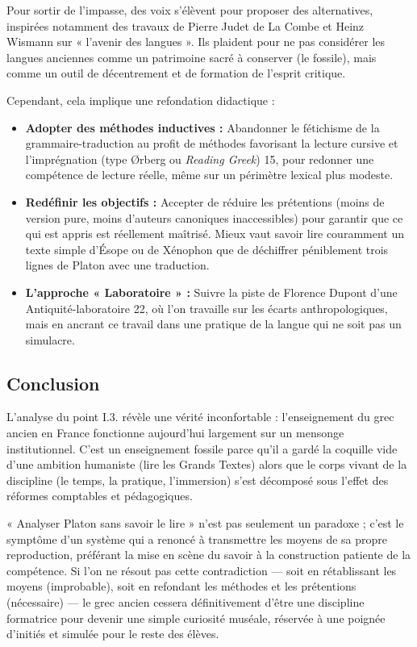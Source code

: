 Pour sortir de l'impasse, des voix s'élèvent pour proposer des alternatives, inspirées notamment des
travaux de Pierre Judet de La Combe et Heinz Wismann sur « l'avenir des langues ».\cite{I-3-3-ref23}
Ils plaident pour ne pas considérer les langues anciennes comme un patrimoine sacré à conserver (le
fossile), mais comme un outil de décentrement et de formation de l'esprit critique.

Cependant, cela implique une refondation didactique :

\begin{itemize}\item \textbf{Adopter des méthodes inductives :} Abandonner le fétichisme de la grammaire-traduction au profit de méthodes favorisant la lecture cursive et l'imprégnation (type Ørberg ou \textit{Reading Greek}) 15, pour redonner une compétence de lecture réelle, même sur un périmètre lexical plus modeste.\item \textbf{Redéfinir les objectifs :} Accepter de réduire les prétentions (moins de version pure, moins d'auteurs canoniques inaccessibles) pour garantir que ce qui est appris est réellement maîtrisé. Mieux vaut savoir lire couramment un texte simple d'Ésope ou de Xénophon que de déchiffrer péniblement trois lignes de Platon avec une traduction.\item \textbf{L'approche « Laboratoire » :} Suivre la piste de Florence Dupont d'une Antiquité-laboratoire 22, où l'on travaille sur les écarts anthropologiques, mais en ancrant ce travail dans une pratique de la langue qui ne soit pas un simulacre.\end{itemize}

\subsection{Conclusion}

L'analyse du point I.3.\cite{I-3-3-ref3} révèle une vérité inconfortable : l'enseignement du grec
ancien en France fonctionne aujourd'hui largement sur un mensonge institutionnel. C'est un
enseignement fossile parce qu'il a gardé la coquille vide d'une ambition humaniste (lire les Grands
Textes) alors que le corps vivant de la discipline (le temps, la pratique, l'immersion) s'est
décomposé sous l'effet des réformes comptables et pédagogiques.

« Analyser Platon sans savoir le lire » n'est pas seulement un paradoxe ; c'est le symptôme d'un
système qui a renoncé à transmettre les moyens de sa propre reproduction, préférant la mise en scène
du savoir à la construction patiente de la compétence. Si l'on ne résout pas cette contradiction —
soit en rétablissant les moyens (improbable), soit en refondant les méthodes et les prétentions
(nécessaire) — le grec ancien cessera définitivement d'être une discipline formatrice pour devenir
une simple curiosité muséale, réservée à une poignée d'initiés et simulée pour le reste des élèves.

